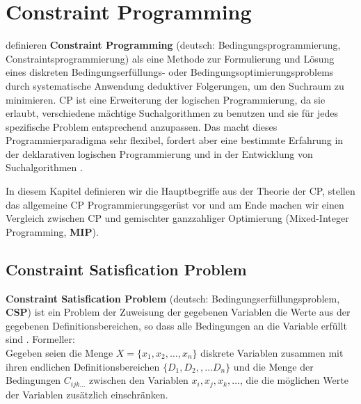 \chapter{Constraint Programming}
\label{sec:CP}

\cite{CPforScheduling} definieren {\bf Constraint Programming} (deutsch: Bedingungsprogrammierung, Constraintsprogrammierung) als eine Methode zur Formulierung und Lösung eines diskreten Bedingungserfüllungs- oder Bedingungsoptimierungsproblems durch systematische Anwendung deduktiver Folgerungen, um den Suchraum zu minimieren. CP ist eine Erweiterung der logischen Programmierung, da sie erlaubt,  verschiedene mächtige Suchalgorithmen zu benutzen und sie für jedes spezifische Problem entsprechend anzupassen. Das macht dieses Programmierparadigma sehr flexibel, fordert aber eine bestimmte Erfahrung in der deklarativen logischen Programmierung und in der Entwicklung von Suchalgorithmen \citep[vgl][]{CPforScheduling}.

In diesem Kapitel definieren wir die Hauptbegriffe aus der Theorie der CP, stellen das allgemeine CP Programmierungsgerüst vor und am Ende machen wir einen Vergleich zwischen CP und gemischter ganzzahliger Optimierung (Mixed-Integer Programming, {\bf MIP}).

\section{Constraint Satisfication Problem}

{\bf Constraint Satisfication Problem} (deutsch: Bedingungserfüllungsproblem, {\bf CSP}) ist ein Problem der Zuweisung der gegebenen Variablen die Werte aus der gegebenen Definitionsbereichen, so dass alle Bedingungen an die Variable erfüllt sind \citep[vgl][]{CSP}. Formeller:\\
Gegeben seien die Menge $X= \{ x_1,x_2,\dots, x_n\}$ diskrete Variablen zusammen mit ihren endlichen Definitionsbereichen $\{ D_1,D_2,,\dots D_n\}$ und die Menge der Bedingungen $C_{ijk\dots}$ zwischen den Variablen $x_i, x_j, x_k, \dots$, die die möglichen Werte der Variablen zusätzlich einschränken.

